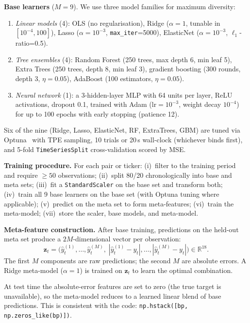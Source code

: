 \documentclass[10pt,twocolumn]{article}
\newcommand{\R}{\mathbb{R}}
\begin{document}
\textbf{Base learners} ($M=9$).
We use three model families for maximum diversity:
\begin{enumerate}
\item \textit{Linear models} (4): OLS (no regularisation), Ridge
  ($\alpha=1$, tunable in $[10^{-4},100]$), Lasso
  ($\alpha=10^{-3}$, \texttt{max\_iter}=5000), ElasticNet
  ($\alpha=10^{-3}$, $\ell_1$-ratio=0.5).
\item \textit{Tree ensembles} (4): Random Forest (250 trees,
  max depth 6, min leaf 5), Extra Trees (250 trees, depth 8,
  min leaf 3), gradient boosting (300 rounds, depth 3,
  $\eta=0.05$), AdaBoost (100 estimators, $\eta=0.05$).
\item \textit{Neural network} (1): a 3-hidden-layer MLP with 64
  units per layer, ReLU activations, dropout 0.1, trained with
  Adam ($\mathrm{lr}=10^{-3}$, weight decay $10^{-4}$) for up to
  100 epochs with early stopping (patience 12).
\end{enumerate}

Six of the nine (Ridge, Lasso, ElasticNet, RF, ExtraTrees, GBM)
are tuned via Optuna~\cite{akiba2019optuna} with TPE sampling,
10 trials or 20\,s wall-clock (whichever binds first), and 5-fold
\texttt{TimeSeriesSplit} cross-validation scored by MSE.

\textbf{Training procedure.}
For each pair or ticker: (i)~filter to the training period and
require $\ge 50$ observations; (ii)~split 80/20 chronologically
into base and meta sets; (iii)~fit a \texttt{StandardScaler} on
the base set and transform both; (iv)~train all 9 base learners
on the base set (with Optuna tuning where applicable);
(v)~predict on the meta set to form meta-features; (vi)~train the
meta-model; (vii)~store the scaler, base models, and meta-model.

\textbf{Meta-feature construction.}
After base training, predictions on the held-out meta set produce a
$2M$-dimensional vector per observation:
\begin{equation}\label{eq:meta}
\bm{z}_t = \big(\hat{y}_t^{(1)},\dots,\hat{y}_t^{(M)},\;
  |\hat{y}_t^{(1)}{-}y_t|,\dots,|\hat{y}_t^{(M)}{-}y_t|\big)
  \in\R^{18}.
\end{equation}
The first $M$ components are raw predictions; the second $M$ are
absolute errors.  A Ridge meta-model ($\alpha=1$) is trained on
$\bm{z}_t$ to learn the optimal combination.

At test time the absolute-error features are set to zero (the true
target is unavailable), so the meta-model reduces to a learned
linear blend of base predictions.  This is consistent with the code:
\texttt{np.hstack([bp, np.zeros\_like(bp)])}.
\end{document}
